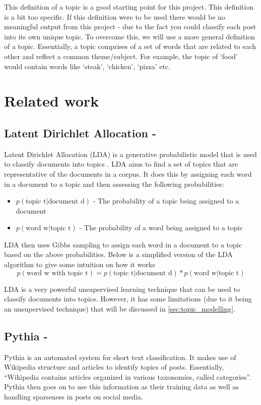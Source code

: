 This definition of a topic is a good starting point for this project. This definition is a bit too specific. If this definition were 
to be used there would be no meaningful output from this project - due to the fact you could classify each post into its own unique
topic. To overcome this, we will use a more general definition of a topic. Essentially, a topic comprises of a set of words that
are related to each other and reflect a common theme/subject. For example, the topic of `food' would contain words like `steak',
`chicken', `pizza' etc.


\section{Related work}
\subsection{Latent Dirichlet Allocation - \cite{latentDirAll}}
Latent Dirichlet Allocation (LDA) is a generative probabilistic model that is used to classify documents into topics \cite{latentDirAll}. LDA aims to find a set of topics that are representative of the documents
in a corpus. It does this by assigning each word in a document to a topic and then assessing the following probabilities:
\begin{itemize}
    \item $p(\text{topic t} \vert \text{document d})$ - The probability of a topic being assigned to a document
    \item $p(\text{word w} \vert \text{topic t})$ - The probability of a word being assigned to a topic
\end{itemize}

LDA then uses Gibbs sampling to assign each word in a document to a topic based on the above probabilities. Below is a
simplified version of the LDA algorithm to give some intuition on how it works
\begin{equation}
    p(\text{word w with topic t}) = p(\text{topic t} \vert \text{document d}) * p(\text{word w} \vert \text{topic t})
\end{equation}

LDA is a very powerful unsupervised learning technique that can be used to classify documents into topics. However,
it has some limitations (due to it being an unsupervised technique) that will be discussed in \cref{sec:topic_modelling}.
\subsection{Pythia - \cite{Pythia}}
\label{sec:pythia}
Pythia is an automated system for short text classification. It makes use of Wikipedia structure and articles to identify
topics of posts.
Essentially, ``Wikipedia contains articles organized in various taxonomies, called categories''. Pythia then goes on to use
this information as their training data as well as handling sparseness in posts on social media.\\

